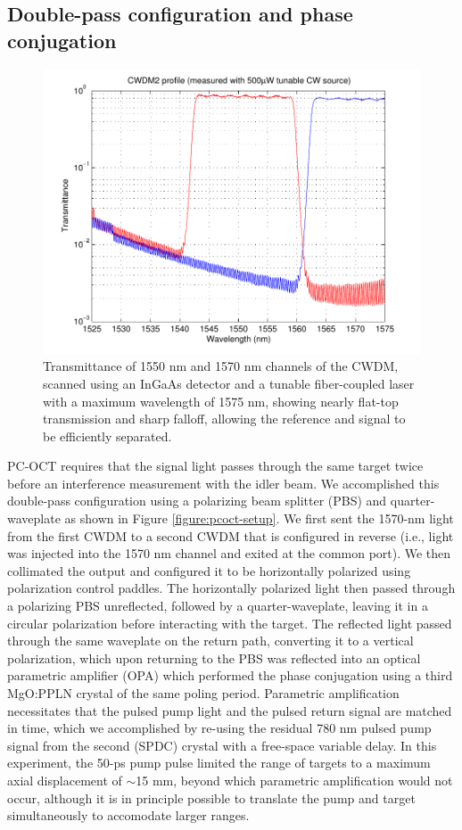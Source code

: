 \subsection{Double-pass configuration and phase conjugation}

\begin{figure}[h]
\begin{center}
\includegraphics[width=12cm]{figure-pcoct-cwdm.pdf}
\caption{Transmittance of 1550 nm and 1570 nm channels of the CWDM, scanned using an InGaAs detector and a tunable fiber-coupled laser with a maximum wavelength of 1575 nm, showing nearly flat-top transmission and sharp falloff, allowing the reference and signal to be efficiently separated.}
\label{figure:pcoct-cwdm}
\end{center}
\end{figure}

PC-OCT requires that the signal light passes through the same target twice before an interference measurement with the idler beam. We accomplished this double-pass configuration using a polarizing beam splitter (PBS) and quarter-waveplate as shown in Figure \ref{figure:pcoct-setup}. We first sent the 1570-nm light from the first CWDM to a second CWDM that is configured in reverse (i.e., light was injected into the 1570 nm channel and exited at the common port). We then collimated the output and configured it to be horizontally polarized using polarization control paddles. The horizontally polarized light then passed through a polarizing PBS unreflected, followed by a quarter-waveplate, leaving it in a circular polarization before interacting with the target. The reflected light passed through the same waveplate on the return path, converting it to a vertical polarization, which upon returning to the PBS was reflected into an optical parametric amplifier (OPA) which performed the phase conjugation using a third MgO:PPLN crystal of the same poling period. Parametric amplification necessitates that the pulsed pump light and the pulsed return signal are matched in time, which we accomplished by re-using the residual 780 nm pulsed pump signal from the second (SPDC) crystal with a free-space variable delay. In this experiment, the 50-ps pump pulse limited the range of targets to a maximum axial displacement of $\sim$15 mm, beyond which parametric amplification would not occur, although it is in principle possible to translate the pump and target simultaneously to accomodate larger ranges.

